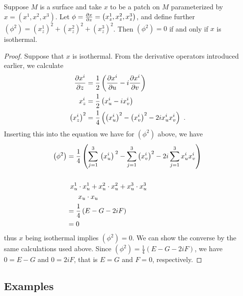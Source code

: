   \begin{lem}
    Suppose $M$ is a surface and take $x$ to be a patch on $M$ parameterized by $x = (x^1, x^2, x^3)$. Let $\phi = \frac{\partial x}{\partial z} = \left(x_z^1, x_z^2, x_z^3\right)$, and define further $\left(\phi^2\right) = \left(x_z^1\right)^2 + \left(x_z^2\right)^2 + \left(x_z^3\right)^2$. Then $\left(\phi^2\right) = 0$ if and only if $x$ is isothermal.
  \end{lem}
  \begin{proof}
    Suppose that $x$ is isothermal. From the derivative operators introduced earlier, we calculate
    \begin{align*}
      \frac{\partial x^i}{\partial z} &= \frac{1}{2}\left(\frac{\partial x^i}{\partial u} - i\frac{\partial x^i}{\partial v}\right)\\
      x^i_z &= \frac{1}{2}\left(x^i_u - ix^i_v\right)\\
      \left(x^i_z\right)^2 &= \frac{1}{4}\left(\left(x_u^i\right)^2 - \left(x_v^i\right)^2 - 2ix_u^ix_v^i\right) \ .
    \end{align*}
    Inserting this into the equation we have for $\left(\phi^2\right)$ above, we have
    \begin{align*}
      \left(\phi^2\right) &= \frac{1}{4}\left(\sum_{j = 1}^3 {\tikzmark{tleft}{}\left(x_u^i\right)\tikzmark{tright}{}}^2 - \sum_{j = 1}^3 \left(x_v^i\right)^2 - 2i\sum_{j = 1}^3 x_u^i x_v^i\right)\\
      &\\
      &\,\,\,\tikzmark{nleft}{}x_u^1\cdot x_u^1 + x_u^2\cdot x_u^2 + x_u^3\cdot x_u^3\tikzmark{nright}{}\\
      &\,\,\,\,\,\,\,\,\,\,\tikzmark{nnleft}{}x_u \cdot x_u\tikzmark{nnright}{}\\
      &= \frac{1}{4}\left(\tikzmark{bleft}{}E\tikzmark{bright}{} - G - 2iF\right)\\
      &= 0
    \end{align*}
    thus $x$ being isothermal implies $\left(\phi^2\right) = 0$. We can show the converse by the same calculations used above. Since $\left(\phi^2\right) = \frac{1}{4}(E - G - 2iF)$, we have $0 = E - G$ and $0 = 2iF$, that is $E = G$ and $F = 0$, respectively.
  \end{proof}


\subsection{Examples}